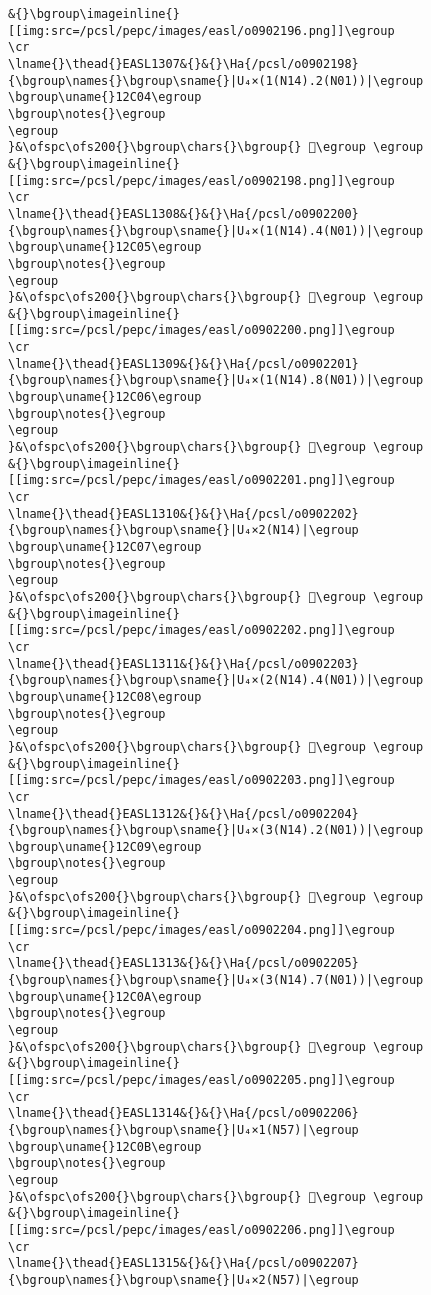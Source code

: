 \begin{verbatim}
&{}\bgroup\imageinline{}[[img:src=/pcsl/pepc/images/easl/o0902196.png]]\egroup
\cr
\lname{}\thead{}EASL1307&{}&{}\Ha{/pcsl/o0902198}{\bgroup\names{}\bgroup\sname{}|U₄×(1(N14).2(N01))|\egroup
\bgroup\uname{}12C04\egroup
\bgroup\notes{}\egroup
\egroup
}&\ofspc\ofs200{}\bgroup\chars{}\bgroup{} 𒰄\egroup \egroup
&{}\bgroup\imageinline{}[[img:src=/pcsl/pepc/images/easl/o0902198.png]]\egroup
\cr
\lname{}\thead{}EASL1308&{}&{}\Ha{/pcsl/o0902200}{\bgroup\names{}\bgroup\sname{}|U₄×(1(N14).4(N01))|\egroup
\bgroup\uname{}12C05\egroup
\bgroup\notes{}\egroup
\egroup
}&\ofspc\ofs200{}\bgroup\chars{}\bgroup{} 𒰅\egroup \egroup
&{}\bgroup\imageinline{}[[img:src=/pcsl/pepc/images/easl/o0902200.png]]\egroup
\cr
\lname{}\thead{}EASL1309&{}&{}\Ha{/pcsl/o0902201}{\bgroup\names{}\bgroup\sname{}|U₄×(1(N14).8(N01))|\egroup
\bgroup\uname{}12C06\egroup
\bgroup\notes{}\egroup
\egroup
}&\ofspc\ofs200{}\bgroup\chars{}\bgroup{} 𒰆\egroup \egroup
&{}\bgroup\imageinline{}[[img:src=/pcsl/pepc/images/easl/o0902201.png]]\egroup
\cr
\lname{}\thead{}EASL1310&{}&{}\Ha{/pcsl/o0902202}{\bgroup\names{}\bgroup\sname{}|U₄×2(N14)|\egroup
\bgroup\uname{}12C07\egroup
\bgroup\notes{}\egroup
\egroup
}&\ofspc\ofs200{}\bgroup\chars{}\bgroup{} 𒰇\egroup \egroup
&{}\bgroup\imageinline{}[[img:src=/pcsl/pepc/images/easl/o0902202.png]]\egroup
\cr
\lname{}\thead{}EASL1311&{}&{}\Ha{/pcsl/o0902203}{\bgroup\names{}\bgroup\sname{}|U₄×(2(N14).4(N01))|\egroup
\bgroup\uname{}12C08\egroup
\bgroup\notes{}\egroup
\egroup
}&\ofspc\ofs200{}\bgroup\chars{}\bgroup{} 𒰈\egroup \egroup
&{}\bgroup\imageinline{}[[img:src=/pcsl/pepc/images/easl/o0902203.png]]\egroup
\cr
\lname{}\thead{}EASL1312&{}&{}\Ha{/pcsl/o0902204}{\bgroup\names{}\bgroup\sname{}|U₄×(3(N14).2(N01))|\egroup
\bgroup\uname{}12C09\egroup
\bgroup\notes{}\egroup
\egroup
}&\ofspc\ofs200{}\bgroup\chars{}\bgroup{} 𒰉\egroup \egroup
&{}\bgroup\imageinline{}[[img:src=/pcsl/pepc/images/easl/o0902204.png]]\egroup
\cr
\lname{}\thead{}EASL1313&{}&{}\Ha{/pcsl/o0902205}{\bgroup\names{}\bgroup\sname{}|U₄×(3(N14).7(N01))|\egroup
\bgroup\uname{}12C0A\egroup
\bgroup\notes{}\egroup
\egroup
}&\ofspc\ofs200{}\bgroup\chars{}\bgroup{} 𒰊\egroup \egroup
&{}\bgroup\imageinline{}[[img:src=/pcsl/pepc/images/easl/o0902205.png]]\egroup
\cr
\lname{}\thead{}EASL1314&{}&{}\Ha{/pcsl/o0902206}{\bgroup\names{}\bgroup\sname{}|U₄×1(N57)|\egroup
\bgroup\uname{}12C0B\egroup
\bgroup\notes{}\egroup
\egroup
}&\ofspc\ofs200{}\bgroup\chars{}\bgroup{} 𒰋\egroup \egroup
&{}\bgroup\imageinline{}[[img:src=/pcsl/pepc/images/easl/o0902206.png]]\egroup
\cr
\lname{}\thead{}EASL1315&{}&{}\Ha{/pcsl/o0902207}{\bgroup\names{}\bgroup\sname{}|U₄×2(N57)|\egroup

\end{verbatim}
